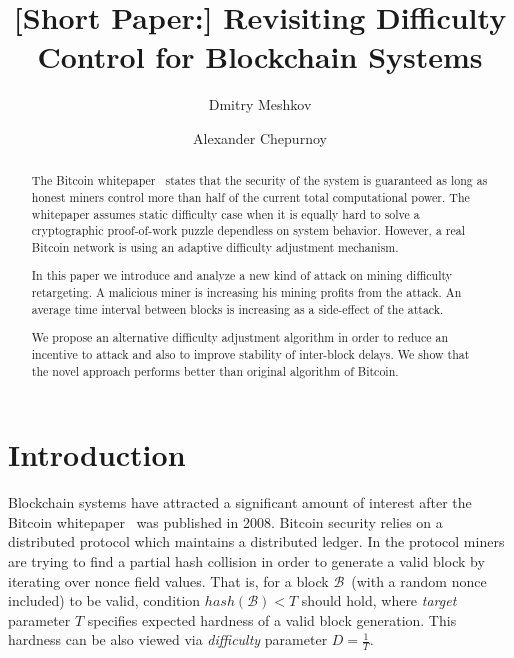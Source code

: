 \documentclass[]{llncs}
\begin{document}
\title{[Short Paper:] Revisiting Difficulty Control for Blockchain Systems}


\author{Dmitry Meshkov \and Alexander Chepurnoy}


\maketitle

\begin{abstract}

The Bitcoin whitepaper~\cite{Nakamoto2008} states that the security of the system is guaranteed as long as honest miners control more than half of the current total computational power. The whitepaper assumes static difficulty case when it is equally hard to solve a cryptographic proof-of-work puzzle dependless on system behavior. However, a real Bitcoin network is using an adaptive difficulty adjustment mechanism.  

In this paper we introduce and analyze a new kind of attack on mining difficulty retargeting. A malicious miner is increasing his mining profits from the attack. An average time interval between blocks is increasing as a side-effect of the attack.

We propose an alternative difficulty adjustment algorithm in order to reduce an incentive to attack and also to improve stability of inter-block delays. We show that the novel approach performs better than original algorithm of Bitcoin.
	
\end{abstract}


\section{Introduction}
\label{sec:intro}

Blockchain systems have attracted a significant amount of interest after the Bitcoin whitepaper~\cite{Nakamoto2008} was published in 2008.
Bitcoin security relies on a distributed protocol which maintains a distributed ledger. In the protocol miners are trying to find a partial hash collision in order to generate a valid block by iterating over nonce field values. That is, for a block $\mathcal{B}$~(with a random nonce included) to be valid, condition $hash(\mathcal{B}) < T$ should hold, where {\em target} parameter $T$ specifies expected hardness of a valid block generation. This hardness can be also viewed via {\em difficulty} parameter $D = \frac{1}{T}$.
\end{document}
